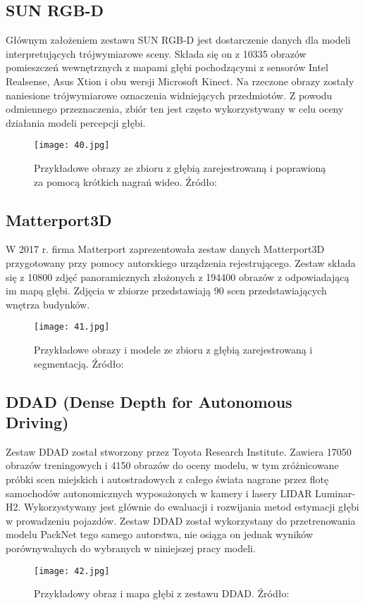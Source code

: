 \subsection{SUN RGB-D}
Głównym założeniem zestawu SUN RGB-D \cite{song2015} jest dostarczenie danych dla modeli interpretujących trójwymiarowe sceny. Składa się on z 10335 obrazów pomieszczeń wewnętrznych z mapami głębi pochodzącymi z sensorów Intel Realsense, Asus Xtion i obu wersji Microsoft Kinect. Na rzeczone obrazy zostały naniesione trójwymiarowe oznaczenia widniejących przedmiotów. Z powodu odmiennego przeznaczenia, zbiór ten jest często wykorzystywany w celu oceny działania modeli percepcji głębi.
\begin{figure}[H]
    \centering
    \texttt{[image: 40.jpg]}
    \caption{Przykładowe obrazy ze zbioru z głębią zarejestrowaną i poprawioną za pomocą krótkich nagrań wideo. Źródło: \cite{song2015}}
    \label{fig:sunrgbd-comparison}
\end{figure}
\subsection{Matterport3D}
W 2017 r. firma Matterport zaprezentowała zestaw danych Matterport3D \cite{chang2017} przygotowany przy pomocy autorskiego urządzenia rejestrującego. Zestaw składa się z 10800 zdjęć panoramicznych złożonych z 194400 obrazów z odpowiadającą im mapą głębi. Zdjęcia w zbiorze przedstawiają 90 scen przedstawiających wnętrza budynków.
\begin{figure}[H]
    \centering
    \texttt{[image: 41.jpg]}
    \caption{Przykładowe obrazy i modele ze zbioru z głębią zarejestrowaną i segmentacją. Źródło: \cite{chang2017}}
    \label{fig:matterport3d-example}
\end{figure} 
\subsection{DDAD (Dense Depth for Autonomous Driving)}
Zestaw DDAD \cite{guizilini2020} został stworzony przez Toyota Research Institute. Zawiera 17050 obrazów treningowych i 4150 obrazów do oceny modelu, w tym zróżnicowane próbki scen miejskich i autostradowych z całego świata nagrane przez flotę samochodów autonomicznych wyposażonych w kamery i lasery LIDAR Luminar-H2. Wykorzystywany jest głównie do ewaluacji i rozwijania metod estymacji głębi w prowadzeniu pojazdów. Zestaw DDAD został wykorzystany do przetrenowania modelu PackNet tego samego autorstwa, nie osiąga on jednak wyników porównywalnych do wybranych w niniejszej pracy modeli.
\begin{figure}[H]
    \centering
    \texttt{[image: 42.jpg]}
    \caption{Przykładowy obraz i mapa głębi z zestawu DDAD. Źródło: \cite{guizilini2020}}
    \label{fig:ddad-example}
\end{figure} 

